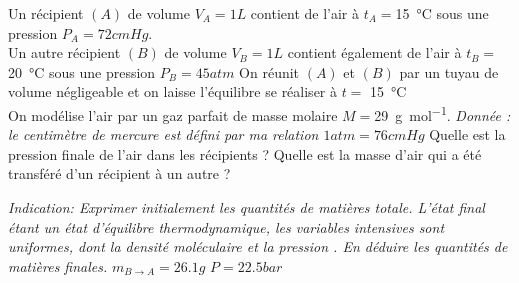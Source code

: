 \begin{Exercise}[title=Deux récipients]
		Un récipient $(A)$ de volume $V_A= 1L $ contient de l'air à $t_A=$\SI{15}{\degreeCelsius} sous une pression $P_A=72cmHg$.\\
		Un autre récipient $(B)$ de volume $V_B=1L$ contient également de l'air à $t_B=$\SI{20}{\degreeCelsius} sous une pression $P_B=45 atm$
		On réunit $(A)$ et $(B)$ par un tuyau de volume négligeable et on laisse l'équilibre se réaliser à $t=$ \SI{15}{\degreeCelsius}\\
		On modélise l'air par un gaz parfait de masse molaire $M=$\SI{29}{\g\per\mol}.
		\emph{Donnée : le centimètre de mercure est défini par ma relation $1 atm = 76cmHg$}
		\Question Quelle est la pression finale de l'air dans les récipients ?
		\Question Quelle est la masse d'air qui a été transféré d'un récipient à un autre ?
\end{Exercise}
\begin{Answer}
		\emph{Indication: Exprimer initialement les quantités de matières totale. L'état final étant un état d'équilibre thermodynamique, les variables intensives sont uniformes, dont la densité moléculaire et la pression . En déduire les quantités de matières finales.}
		\Question $m_{B\to A}=26.1g$
		\Question $P=22.5 bar$
\end{Answer}
